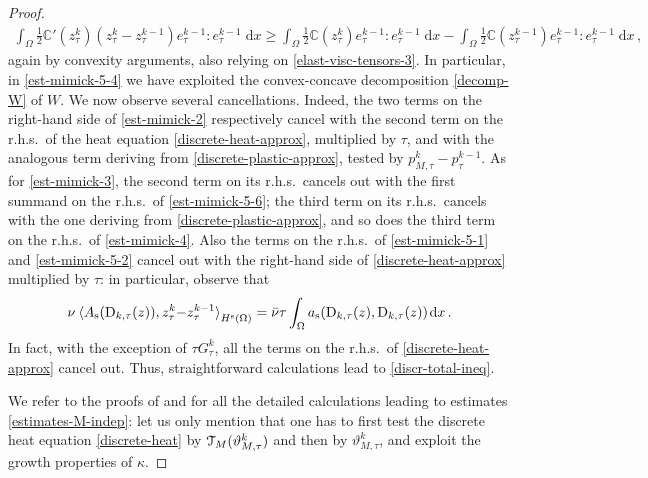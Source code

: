 \documentclass[a4paper,10pt,reqno]{amsart}
\numberwithin{equation}{section}
\numberwithin{equation}{section}
\def\dd{\;\!\mathrm{d}} %
\newcommand{\pairing}[4]{ \sideset{_{ #1 }}{_{ #2 }}  {\mathop{\langle #3 , #4
\rangle}}}
\newcommand{\teta}{\vartheta}
\newcommand{\bbC}{\mathbb{C}}
\newcommand{\condu}{\kappa}
\newcommand{\spz}{H^{\mathrm{s}}(\Omega)}
\newcommand{\As}{A_{\mathrm{s}}}
\newcommand{\ass}{a_{\mathrm{s}}}
\newcommand{\Gtau}[1]{G_\tau^{#1}}
\newcommand{\ptau}[1]{p_\tau^{#1}}
\newcommand{\ztau}[1]{z_\tau^{#1}}
\newcommand{\etau}[1]{e_\tau^{#1}}
\newcommand{\tetau}[1]{\teta_\tau^{#1}}
\newcommand{\Dtau}[2]{\mathrm{D}_{#1,\tau}(#2)}
\newcommand{\tetaum}[1]{\teta_{M,\tau}^{#1}}
\newcommand{\ptaum}[1]{p_{M,\tau}^{#1}}
\newcommand{\EEE}{\color{black}}
\newcommand{\MMM}{\color{black}}%
\begin{document}
\begin{proof}
\begin{subequations}
\begin{align}
 \int_\Omega \tfrac12 {\bbC}'(\ztau k)  (\ztau{k} {-} \ztau{k-1})  \etau{k-1}{:} \etau{k-1}  \dd x\geq \int_\Omega \tfrac12 {\bbC}(\ztau k)  \etau{k-1}{:} \etau{k-1}  \dd x - \int_\Omega \tfrac12 {\bbC}(\ztau{k-1})  \etau{k-1}{:} \etau{k-1}  \dd x\,,
 \end{align}
\end{subequations}
again by convexity arguments,
also relying on \eqref{elast-visc-tensors-3}.
 In particular, in \eqref{est-mimick-5-4} we 
 have  exploited  the convex-concave decomposition \eqref{decomp-W} of $W$.
 We now observe several cancellations. Indeed, 
 the two  terms on the  right-hand side of  \eqref{est-mimick-2} respectively
  cancel with the second term on the r.h.s.\ of  the heat equation
  \eqref{discrete-heat-approx}, multiplied by $\tau$, and with the analogous term deriving from   \eqref{discrete-plastic-approx}, tested by $\ptaum{k} - \ptau{k-1}$. 
 As for   \eqref{est-mimick-3},  the second term on its r.h.s.\ 
     cancels out with the first summand on the r.h.s.\ of  \eqref{est-mimick-5-6}; the third term on its r.h.s.\ cancels with the one deriving from  \eqref{discrete-plastic-approx}, and
      so does the third term on the r.h.s.\ of \eqref{est-mimick-4}. 
      Also the terms on the r.h.s.\ of \eqref{est-mimick-5-1} and \eqref{est-mimick-5-2} cancel out with the right-hand side of  
      \eqref{discrete-heat-approx} multiplied by $\tau$: in particular, observe that 
      \[
      \nu \pairing{}{\spz}{\As(\Dtau kz)}{\ztau k{-} \ztau {k-1}} = \bar{\nu}  \tau \int_\Omega  \ass(\Dtau kz,\Dtau kz) \dd x \,.
      \]
In fact, with the exception of $\tau \Gtau k$, all the terms on the r.h.s.\ of 
  \eqref{discrete-heat-approx}
cancel out.
Thus, straightforward calculations lead to  \eqref{discr-total-ineq}. 
\par
We refer to the proofs of  \cite[Lemma 3.5]{Rossi2016} and \cite[Lemma 4.4]{Rocca-Rossi} for all the detailed calculations leading to estimates \eqref{estimates-M-indep}: \MMM let us only mention that 
one has to first test   the discrete heat equation \eqref{discrete-heat} by $\calT_M(\tetaum k )$ and then by $\tetaum k $, and 
exploit the growth properties of $\condu$. \EEE
\end{proof}
\end{document}
